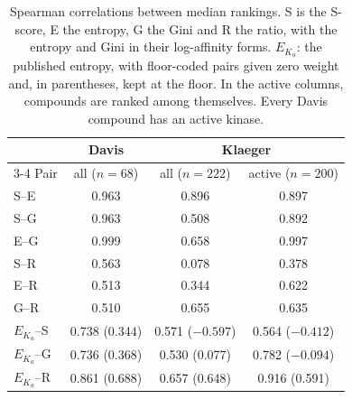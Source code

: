 \documentclass{article}
\begin{document}
\setcounter{table}{2}
\begin{table}[h]
  \centering
  \caption{Spearman correlations between median rankings. S is the S-score, E
           the entropy, G the Gini and R the ratio, with the entropy and Gini in their
           log-affinity forms. $E_{K_a}$: the published entropy, with
           floor-coded pairs given zero weight and, in parentheses, kept at the
           floor. In the active columns, compounds are ranked among themselves.
           Every Davis compound has an active kinase.}
  \label{tab:correlations}
  \begin{tabular}{lccc}
    \toprule
         & Davis & \multicolumn{2}{c}{Klaeger} \\
    \cmidrule(lr){3-4}
    Pair & all ($n = 68$) & all ($n = 222$) & active ($n = 200$) \\
    \midrule
    S--E & 0.963 & 0.896 & 0.897 \\
    S--G & 0.963 & 0.508 & 0.892 \\
    E--G & 0.999 & 0.658 & 0.997 \\
    S--R & 0.563 & 0.078 & 0.378 \\
    E--R & 0.513 & 0.344 & 0.622 \\
    G--R & 0.510 & 0.655 & 0.635 \\
    \midrule
    $E_{K_a}$--S & 0.738 (0.344) & 0.571 ($-0.597$) & 0.564 ($-0.412$) \\
    $E_{K_a}$--G & 0.736 (0.368) & 0.530 (0.077)    & 0.782 ($-0.094$) \\
    $E_{K_a}$--R & 0.861 (0.688) & 0.657 (0.648)    & 0.916 (0.591) \\
    \bottomrule
  \end{tabular}
\end{table}
\end{document}
